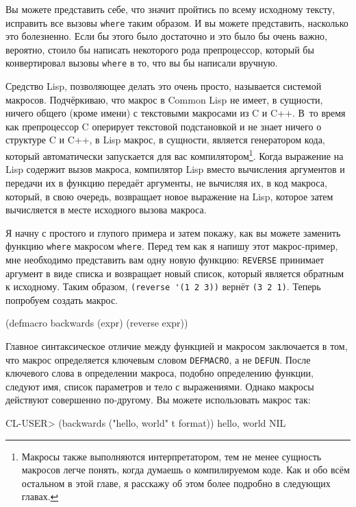 Вы можете представить себе, что значит пройтись по всему исходному тексту, исправить все
вызовы \lstinline{where} таким образом. И вы можете представить, насколько это болезненно. Если
бы этого было достаточно и это было бы очень важно, вероятно, стоило бы написать
некоторого рода препроцессор, который бы конвертировал вызовы \lstinline{where} в то, что вы бы
написали вручную.

Средство Lisp, позволяющее делать это очень просто, называется системой
макросов. Подчёркиваю, что макрос в Common Lisp не имеет, в сущности, ничего общего (кроме
имени) с текстовыми макросами из C и C++. В~то время как препроцессор C оперирует
текстовой подстановкой и не знает ничего о структуре C и C++, в Lisp макрос, в сущности,
является генератором кода, который автоматически запускается для вас
компилятором\footnote{Макросы также выполняются интерпретатором, тем не менее
  сущность макросов легче понять, когда думаешь о компилируемом коде. Как и обо всём
  остальном в этой главе, я расскажу об этом более подробно в следующих главах.}. Когда
выражение на Lisp содержит вызов макроса, компилятор Lisp вместо вычисления аргументов и
передачи их в функцию передаёт аргументы, не вычисляя их, в код макроса, который, в свою
очередь, возвращает новое выражение на Lisp, которое затем вычисляется в месте исходного
вызова макроса.

Я начну с простого и глупого примера и затем покажу, как вы можете заменить функцию
\lstinline{where} макросом \lstinline{where}. Перед тем как я напишу этот макрос-пример, мне
необходимо представить вам одну новую функцию: \lstinline{REVERSE} принимает аргумент в виде
списка и возвращает новый список, который является обратным к исходному. Таким образом,
\lstinline{(reverse '(1 2 3))} вернёт \lstinline{(3 2 1)}. Теперь попробуем создать макрос.

\begin{myverb}
(defmacro backwards (expr)
  (reverse expr))
\end{myverb}

Главное синтаксическое отличие между функцией и макросом заключается в том, что макрос
определяется ключевым словом \lstinline{DEFMACRO}, а не \lstinline{DEFUN}. После ключевого слова в
определении макроса, подобно определению функции, следуют имя, список параметров и тело с
выражениями. Однако макросы действуют совершенно по-другому. Вы можете использовать макрос
так:

\begin{myverb}
CL-USER> (backwards ("hello, world" t format))
hello, world
NIL
\end{myverb}

